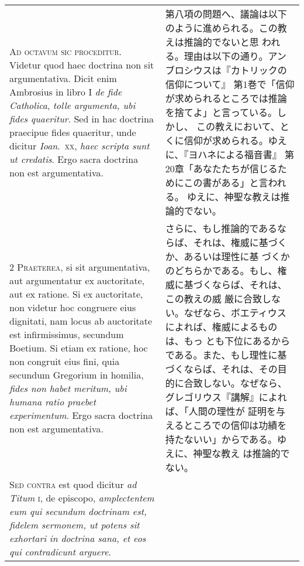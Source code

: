 \documentclass[10pt]{jsarticle} %
\begin{document}
\begin{longtable}{p{21em}p{21em}}

{\Huge A}{\scshape d octavum sic proceditur}. Videtur quod haec
doctrina non sit argumentativa. Dicit enim Ambrosius in libro I {\itshape de fide
Catholica}, {\itshape tolle argumenta, ubi fides quaeritur}. Sed in hac doctrina
praecipue fides quaeritur, unde dicitur {\itshape Ioan}.~{\scshape xx}, {\itshape haec scripta sunt ut
credatis}. Ergo sacra doctrina non est argumentativa.


&

第八項の問題へ、議論は以下のように進められる。この教えは推論的でないと思
 われる。理由は以下の通り。アンブロシウスは『カトリックの信仰について』
 第1巻で「信仰が求められるところでは推論を捨てよ」と言っている。しかし、
 この教えにおいて、とくに信仰が求められる。ゆえに、『ヨハネによる福音書』
 第20章「あなたたちが信じるためにこの書がある」と言われる。
ゆえに、神聖な教えは推論的でない。


\\


{\scshape 2 Praeterea}, si sit argumentativa, aut
argumentatur ex auctoritate, aut ex ratione. Si ex auctoritate, non
videtur hoc congruere eius dignitati, nam locus ab auctoritate est
infirmissimus, secundum Boetium. Si etiam ex ratione, hoc non congruit
eius fini, quia secundum Gregorium in homilia, {\itshape fides non habet meritum,
ubi humana ratio praebet experimentum}. Ergo sacra doctrina non est
argumentativa.


&

さらに、もし推論的であるならば、それは、権威に基づくか、あるいは理性に基
 づくかのどちらかである。もし、権威に基づくならば、それは、この教えの威
 厳に合致しない。なぜなら、ボエティウスによれば、権威によるものは、もっ
 とも下位にあるからである。また、もし理性に基づくならば、それは、その目
 的に合致しない。なぜなら、グレゴリウス『講解』によれば、「人間の理性が
 証明を与えるところでの信仰は功績を持たないい」からである。ゆえに、神聖な教え
 は推論的でない。


\\


{\scshape Sed contra} est quod dicitur {\itshape ad Titum} {\scshape i}, de
episcopo, {\itshape amplectentem eum qui secundum doctrinam est, fidelem sermonem,
ut potens sit exhortari in doctrina sana, et eos qui contradicunt
arguere}.


&


\end{longtable}
\end{document}
